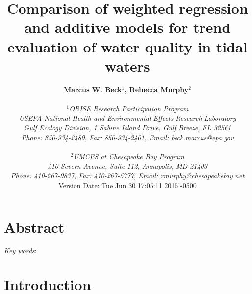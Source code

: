 \documentclass[letterpaper,12pt,oneside]{article}\usepackage[]{graphicx}\usepackage[]{color}
\begin{document}
\raggedbottom
\raggedright
{}
\setlength{\parindent}{0.5in}
\renewcommand\refname{References \vspace{12pt}}

\begin{singlespace}
\title{{\bf {\Large Comparison of weighted regression and additive models for trend evaluation of water quality in tidal waters}}}
\author{
  {\bf {\normalsize Marcus W. Beck$^1$, Rebecca Murphy$^2$}}
  \\\\{\textit {\normalsize $^1$ORISE Research Participation Program}}
  \\{\textit {\normalsize USEPA National Health and Environmental Effects Research Laboratory}}
  \\{\textit {\normalsize Gulf Ecology Division, 1 Sabine Island Drive, Gulf Breeze, FL 32561}}
	\\{\textit {\normalsize Phone: 850-934-2480, Fax: 850-934-2401, Email: \href{mailto:beck.marcus@epa.gov}{beck.marcus@epa.gov}}}
  \\\\{\textit {\normalsize $^2$UMCES at Chesapeake Bay Program}}
	\\{\textit {\normalsize 410 Severn Avenue, Suite 112, Annapolis, MD 21403}}
	\\{\textit {\normalsize Phone: 410-267-9837, Fax: 410-267-5777, Email: \href{mailto:rmurphy@chesapeakbay.net}{rmurphy@chesapeakebay.net}}}
  \vspace{1in} 
  \\ Version Date:   Tue Jun 30 17:05:11 2015 -0500
	}
\date{}
\maketitle
\end{singlespace}
\clearpage

\section*{Abstract}

\noindent \textit{Key words}:

\clearpage

\acresetall

\section{Introduction}
\end{document}
